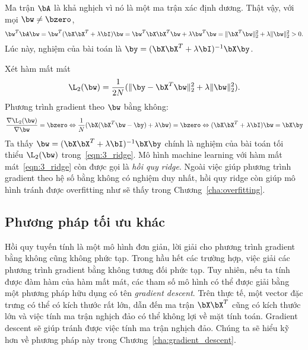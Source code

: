 Ma trận $\bA$ là khả nghịch vì nó là một ma trận xác định dương. Thật vậy, với
mọi $\bw \neq \bzero$,
\begin{equation*}
    \bw^T\bA\bw = \bw^T(\bX\bX^T + \lambda \bI) \bw = \bw^T\bX\bX^T\bw  +
    \lambda \bw^T\bw = \|\bX^T\bw\|_2^2 + \lambda \|\bw\|_2^2 > 0.
\end{equation*}
Lúc này, nghiệm của bài toán là $\by = (\bX \bX^T + \lambda \bI)^{-1} \bX\by$.

Xét hàm mất mát
\begin{equation}
    \label{eqn:3_ridge}
    \L_2(\bw) = \frac{1}{2N}(\|\by - \bX^T\bw\|_2^2 + \lambda\|\bw\|_2^2).
\end{equation}
Phương trình gradient theo $\bw$ bằng không: 
\begin{equation}
    \frac{\nabla \L_2(\bw)}{\nabla \bw} = \bzero \Leftrightarrow
    \frac{1}{N}(\bX(\bX^T\bw - \by) + \lambda \bw) = \bzero \Leftrightarrow
    (\bX\bX^T + \lambda \bI) \bw = \bX\by 
\end{equation}
Ta thấy $\bw = (\bX\bX^T + \lambda\bI)^{-1}\bX\by$ chính là nghiệm của
bài toán tối thiểu $\L_2(\bw)$ trong~\eqref{eqn:3_ridge}. Mô hình machine learning với hàm mất mát~\eqref{eqn:3_ridge} còn được
gọi là \textit{hồi quy ridge}. 
 Ngoài việc giúp phương trình gradient theo hệ số bằng không có nghiệm duy
nhất, hồi quy ridge còn giúp mô hình tránh được overfitting như sẽ thấy trong Chương~\ref{cha:overfitting}. 

\subsection{Phương pháp tối ưu khác}


Hồi quy tuyến tính là một mô hình đơn giản, lời giải cho phương trình gradient
bằng không cũng không phức tạp. {Trong hầu hết các trường hợp, việc giải các
phương trình gradient bằng không tương đối phức tạp.} Tuy nhiên, nếu ta tính được đàm hàm của hàm mất mát, các tham số mô hình có thể được giải bằng một phương pháp hữu dụng có tên \textit{gradient descent}. Trên thực tế, một vector đặc trưng có thể
có kích thước rất lớn, dẫn đến ma trận $\bX\bX^T$ cũng có kích thước lớn và việc
tính ma trận nghịch đảo có thể không lợi về mặt tính toán. Gradient descent sẽ
giúp tránh được việc tính ma trận nghịch đảo. Chúng ta sẽ hiểu kỹ hơn về phương
pháp này trong Chương~\ref{cha:gradient_descent}.


 